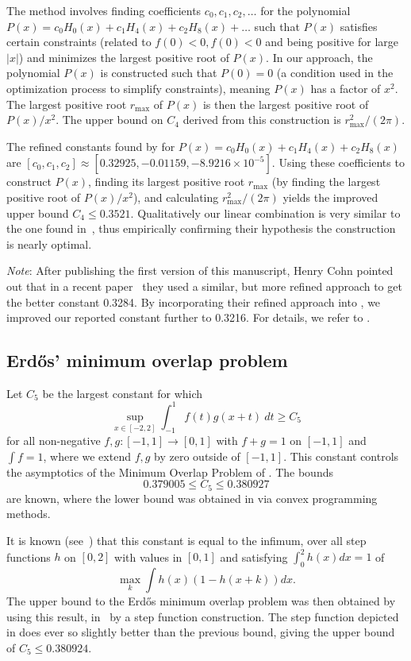 The method involves finding coefficients $c_0, c_1, c_2, \dots$ for the polynomial $P(x) = c_0 H_0(x) + c_1 H_4(x) + c_2 H_8(x) + \dots$ such that $P(x)$ satisfies certain constraints (related to $f(0)<0, \hat f(0)<0$ and being positive for large $|x|$) and minimizes the largest positive root of $P(x)$. In our approach, the polynomial $P(x)$ is constructed such that $P(0)=0$ (a condition used in the optimization process to simplify constraints), meaning $P(x)$ has a factor of $x^2$. The largest positive root $r_{\max}$ of $P(x)$ is then the largest positive root of $P(x)/x^2$. The upper bound on $C_4$ derived from this construction is $r_{\max}^2 / (2\pi)$.

The refined constants found by \method for $P(x) = c_0 H_0(x) + c_1 H_4(x) + c_2 H_8(x)$ are $[c_0, c_1, c_2] \approx [0.32925, -0.01159, -8.9216 \times 10^{-5}]$. Using these coefficients to construct $P(x)$, finding its largest positive root $r_{\max}$ (by finding the largest positive root of $P(x)/x^2$), and calculating $r_{\max}^2 / (2\pi)$ yields the improved upper bound $C_4 \leq 0.3521$. Qualitatively our linear combination is very similar to the one found in~\cite{gonccalves2017hermite}, thus empirically confirming their hypothesis the construction is nearly optimal.

\emph{Note}: After publishing the first version of this manuscript, Henry Cohn pointed out that in a recent paper~\cite{cohn2019optimal} they used a similar, but more refined approach to get the better constant 0.3284. By incorporating their refined approach into \method, we improved our reported constant further to 0.3216. For details, we refer to \ResultsColab.


\subsection{Erd\H{o}s' minimum overlap problem}
Let $C_5$ be the largest constant for which
$$ \sup_{x \in [-2,2]} \int_{-1}^1 f(t) g(x+t)\ dt\geq C_5$$
for all non-negative $f,g: [-1,1] \to [0,1]$ with $f+g=1$ on $[-1,1]$ and $\int f = 1$, where we extend $f,g$ by zero outside of $[-1,1]$. This constant controls the asymptotics of the Minimum Overlap Problem of \cite{erdHos1955some}.  The bounds
$$ 0.379005 \leq C_5 \leq 0.380927$$
are known, where the lower bound was obtained in \cite{white2023new} via convex programming methods.

It is known (see~\cite{haugland2016minimum}) that
this constant is equal to the infimum, over all step
functions $h$ on $[0, 2]$ with values in $[0, 1]$ and satisfying
$
\int_0^2 h(x)dx = 1
$
of
$$
\max_k \int h(x)(1 - h(x+k))dx 
.$$ The upper bound to the Erd\H{o}s minimum overlap problem was then obtained by using this result, in~\cite{haugland2016minimum} by a step function
construction. The step function depicted in  does ever so slightly better than the previous bound, giving the upper bound of $C_5 \leq 0.380924$.


